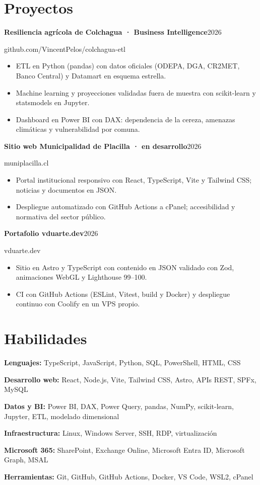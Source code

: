 \documentclass[10pt,a4paper]{article}
\newcommand{\entry}[3]{%
  \textbf{#1}\hfill #2\par
  #3\par
}
\begin{document}
\section{Proyectos}
\entry{Resiliencia agrícola de Colchagua · Business Intelligence}{2026}{github.com/VincentPelos/colchagua-etl}
\begin{itemize}
  \item ETL en Python (pandas) con datos oficiales (ODEPA, DGA, CR2MET, Banco Central) y Datamart en esquema estrella.
  \item Machine learning y proyecciones validadas fuera de muestra con scikit-learn y statsmodels en Jupyter.
  \item Dashboard en Power BI con DAX: dependencia de la cereza, amenazas climáticas y vulnerabilidad por comuna.
\end{itemize}
\vspace{4pt}
\entry{Sitio web Municipalidad de Placilla · en desarrollo}{2026}{muniplacilla.cl}
\begin{itemize}
  \item Portal institucional responsivo con React, TypeScript, Vite y Tailwind CSS; noticias y documentos en JSON.
  \item Despliegue automatizado con GitHub Actions a cPanel; accesibilidad y normativa del sector público.
\end{itemize}
\vspace{4pt}
\entry{Portafolio vduarte.dev}{2026}{vduarte.dev}
\begin{itemize}
  \item Sitio en Astro y TypeScript con contenido en JSON validado con Zod, animaciones WebGL y Lighthouse 99--100.
  \item CI con GitHub Actions (ESLint, Vitest, build y Docker) y despliegue continuo con Coolify en un VPS propio.
\end{itemize}

\section{Habilidades}
\textbf{Lenguajes:} TypeScript, JavaScript, Python, SQL, PowerShell, HTML, CSS\par
\textbf{Desarrollo web:} React, Node.js, Vite, Tailwind CSS, Astro, APIs REST, SPFx, MySQL\par
\textbf{Datos y BI:} Power BI, DAX, Power Query, pandas, NumPy, scikit-learn, Jupyter, ETL, modelado dimensional\par
\textbf{Infraestructura:} Linux, Windows Server, SSH, RDP, virtualización\par
\textbf{Microsoft 365:} SharePoint, Exchange Online, Microsoft Entra ID, Microsoft Graph, MSAL\par
\textbf{Herramientas:} Git, GitHub, GitHub Actions, Docker, VS Code, WSL2, cPanel\par
\end{document}
